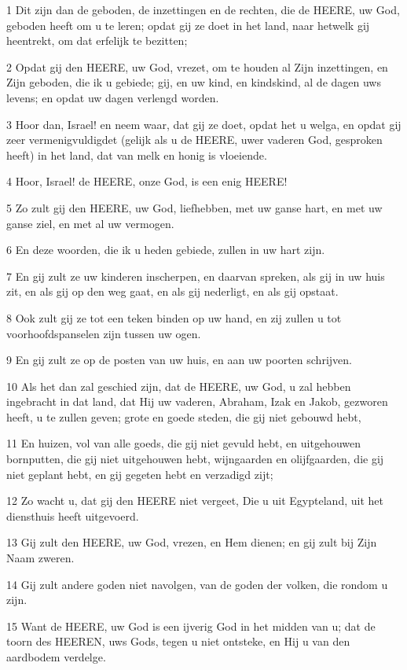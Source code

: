 \par 1 Dit zijn dan de geboden, de inzettingen en de rechten, die de HEERE, uw God, geboden heeft om u te leren; opdat gij ze doet in het land, naar hetwelk gij heentrekt, om dat erfelijk te bezitten;
\par 2 Opdat gij den HEERE, uw God, vrezet, om te houden al Zijn inzettingen, en Zijn geboden, die ik u gebiede; gij, en uw kind, en kindskind, al de dagen uws levens; en opdat uw dagen verlengd worden.
\par 3 Hoor dan, Israel! en neem waar, dat gij ze doet, opdat het u welga, en opdat gij zeer vermenigvuldigdet (gelijk als u de HEERE, uwer vaderen God, gesproken heeft) in het land, dat van melk en honig is vloeiende.
\par 4 Hoor, Israel! de HEERE, onze God, is een enig HEERE!
\par 5 Zo zult gij den HEERE, uw God, liefhebben, met uw ganse hart, en met uw ganse ziel, en met al uw vermogen.
\par 6 En deze woorden, die ik u heden gebiede, zullen in uw hart zijn.
\par 7 En gij zult ze uw kinderen inscherpen, en daarvan spreken, als gij in uw huis zit, en als gij op den weg gaat, en als gij nederligt, en als gij opstaat.
\par 8 Ook zult gij ze tot een teken binden op uw hand, en zij zullen u tot voorhoofdspanselen zijn tussen uw ogen.
\par 9 En gij zult ze op de posten van uw huis, en aan uw poorten schrijven.
\par 10 Als het dan zal geschied zijn, dat de HEERE, uw God, u zal hebben ingebracht in dat land, dat Hij uw vaderen, Abraham, Izak en Jakob, gezworen heeft, u te zullen geven; grote en goede steden, die gij niet gebouwd hebt,
\par 11 En huizen, vol van alle goeds, die gij niet gevuld hebt, en uitgehouwen bornputten, die gij niet uitgehouwen hebt, wijngaarden en olijfgaarden, die gij niet geplant hebt, en gij gegeten hebt en verzadigd zijt;
\par 12 Zo wacht u, dat gij den HEERE niet vergeet, Die u uit Egypteland, uit het diensthuis heeft uitgevoerd.
\par 13 Gij zult den HEERE, uw God, vrezen, en Hem dienen; en gij zult bij Zijn Naam zweren.
\par 14 Gij zult andere goden niet navolgen, van de goden der volken, die rondom u zijn.
\par 15 Want de HEERE, uw God is een ijverig God in het midden van u; dat de toorn des HEEREN, uws Gods, tegen u niet ontsteke, en Hij u van den aardbodem verdelge.
